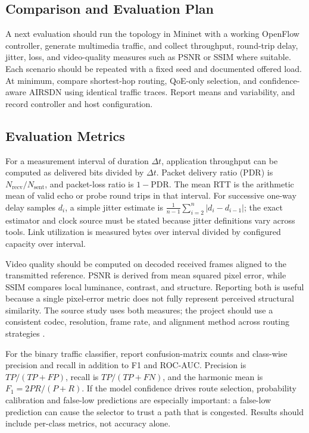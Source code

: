 \documentclass[conference]{IEEEtran}
\begin{document}
\subsection{Comparison and Evaluation Plan}
A next evaluation should run the topology in Mininet with a working OpenFlow controller, generate multimedia traffic, and collect throughput, round-trip delay, jitter, loss, and video-quality measures such as PSNR or SSIM where suitable. Each scenario should be repeated with a fixed seed and documented offered load. At minimum, compare shortest-hop routing, QoE-only selection, and confidence-aware AIRSDN using identical traffic traces. Report means and variability, and record controller and host configuration.

\subsection{Evaluation Metrics}
For a measurement interval of duration $\Delta t$, application throughput can be computed as delivered bits divided by $\Delta t$. Packet delivery ratio (PDR) is $N_{\mathrm{recv}}/N_{\mathrm{sent}}$, and packet-loss ratio is $1-\mathrm{PDR}$. The mean RTT is the arithmetic mean of valid echo or probe round trips in that interval. For successive one-way delay samples $d_i$, a simple jitter estimate is $\frac{1}{n-1}\sum_{i=2}^{n}|d_i-d_{i-1}|$; the exact estimator and clock source must be stated because jitter definitions vary across tools. Link utilization is measured bytes over interval divided by configured capacity over interval.

Video quality should be computed on decoded received frames aligned to the transmitted reference. PSNR is derived from mean squared pixel error, while SSIM compares local luminance, contrast, and structure. Reporting both is useful because a single pixel-error metric does not fully represent perceived structural similarity. The source study uses both measures; the project should use a consistent codec, resolution, frame rate, and alignment method across routing strategies \cite{ipek2025airsdn}.

For the binary traffic classifier, report confusion-matrix counts and class-wise precision and recall in addition to F1 and ROC-AUC. Precision is $TP/(TP+FP)$, recall is $TP/(TP+FN)$, and the harmonic mean is $F_1=2PR/(P+R)$. If the model confidence drives route selection, probability calibration and false-low predictions are especially important: a false-low prediction can cause the selector to trust a path that is congested. Results should include per-class metrics, not accuracy alone.
\end{document}
